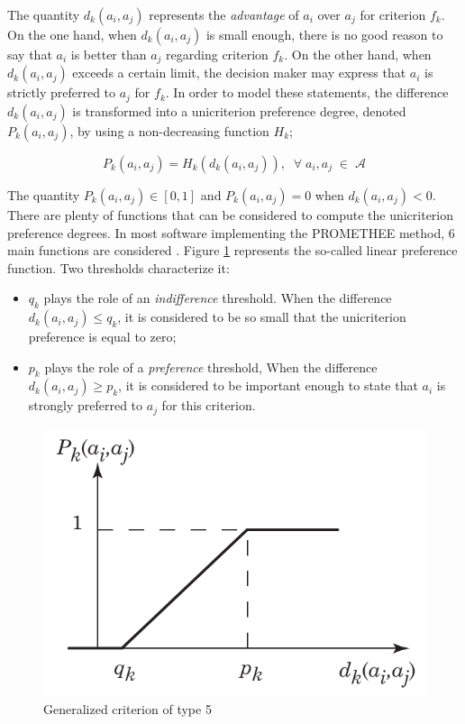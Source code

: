 \documentclass{svmono}
\begin{document}
The quantity $d_k(a_i,a_j)$ represents the \textit{advantage} of $a_i$ over $a_j$ for criterion $f_k$. On the one hand, when $d_k(a_i,a_j)$ is small enough, there is no good reason to say that $a_i$ is better than $a_j$ regarding criterion $f_k$. On the other hand, when $d_k(a_i,a_j)$ exceeds a certain limit, the decision maker may express that $a_i$ is strictly preferred to $a_j$ for $f_k$. In order to model these statements, the difference $d_k(a_i,a_j)$ is transformed into a unicriterion preference degree, denoted $ P_k(a_i,a_j)$, by using a non-decreasing function $H_k$;

$$
P_k(a_i,a_j) = H_k(d_k(a_i,a_j)), \; \; \forall \; a_i, a_j \; \in \; \mathcal{A}
$$

The quantity $P_k(a_i,a_j) \in [0, 1]$ and $P_k(a_i,a_j)=0$ when $d_k(a_i,a_j) <0$. There are plenty of functions that can be considered to compute the unicriterion preference degrees. In most software implementing the PROMETHEE method, $6$ main functions are considered \cite{Hayez}. Figure \ref{fig:criterion5} represents the so-called linear preference function. Two thresholds characterize it:
\begin{itemize}
\item $q_k$ plays the role of an \textit{indifference} threshold. When the difference $d_k(a_i,a_j) \leq q_k$, it is considered to be so small that the unicriterion preference is equal to zero;
\item $p_k$ plays the role of a \textit{preference} threshold, When the difference $d_k(a_i,a_j) \geq p_k$, it is considered to be important enough to state that $a_i$ is strongly preferred to $a_j$ for this criterion.
\end{itemize}

\begin{figure}[h!]
\begin{center}
\includegraphics[width=0.7\linewidth]{criterion5.pdf}
\end{center}
\caption{Generalized criterion of type 5}
\label{fig:criterion5}
\end{figure}
\end{document}
